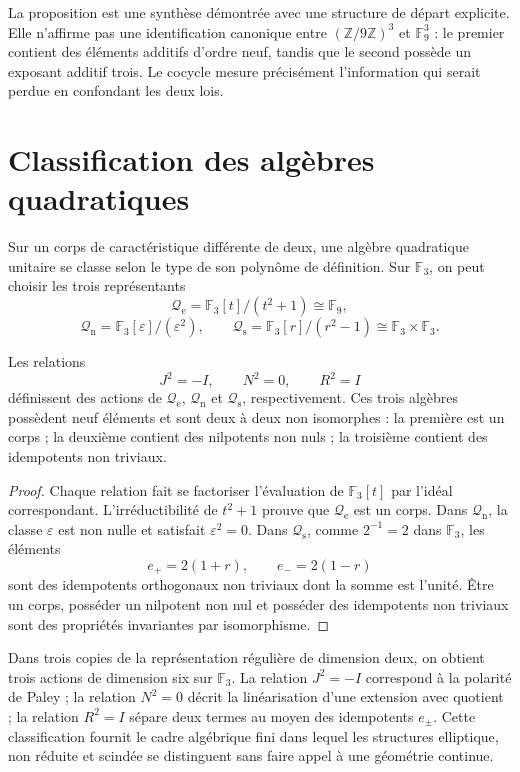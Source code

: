 La proposition est une synthèse démontrée avec une structure de départ
explicite. Elle n'affirme pas une identification canonique entre
\((\mathbb Z/9\mathbb Z)^3\) et \(\mathbb F_9^3\) : le premier contient des
éléments additifs d'ordre neuf, tandis que le second possède un exposant
additif trois. Le cocycle mesure précisément l'information qui serait perdue en
confondant les deux lois.

\section{Classification des algèbres quadratiques}

Sur un corps de caractéristique différente de deux, une algèbre quadratique
unitaire se classe selon le type de son polynôme de définition. Sur
\(\mathbb F_3\), on peut choisir les trois représentants
\[
 \mathcal Q_{\mathrm e}
 =\mathbb F_3[t]/(t^2+1)\cong\mathbb F_9,
\]
\[
 \mathcal Q_{\mathrm n}
 =\mathbb F_3[\varepsilon]/(\varepsilon^2),
 \qquad
 \mathcal Q_{\mathrm s}
 =\mathbb F_3[r]/(r^2-1)
 \cong\mathbb F_3\times\mathbb F_3.
\]

\begin{theorem}
\label{thm:clasificacion-cuadratica-nonadica}
Les relations
\[
 J^2=-I,\qquad N^2=0,\qquad R^2=I
\]
définissent des actions de
\(\mathcal Q_{\mathrm e}\), \(\mathcal Q_{\mathrm n}\) et
\(\mathcal Q_{\mathrm s}\), respectivement. Ces trois algèbres possèdent
neuf éléments et sont deux à deux non isomorphes : la première est un corps ; la
deuxième contient des nilpotents non nuls ; la troisième contient des idempotents non
triviaux.
\end{theorem}

\begin{proof}
Chaque relation fait se factoriser l'évaluation de
\(\mathbb F_3[t]\) par l'idéal correspondant. L'irréductibilité de
\(t^2+1\) prouve que \(\mathcal Q_{\mathrm e}\) est un corps. Dans
\(\mathcal Q_{\mathrm n}\), la classe \(\varepsilon\) est non nulle et satisfait
\(\varepsilon^2=0\). Dans \(\mathcal Q_{\mathrm s}\), comme \(2^{-1}=2\) dans
\(\mathbb F_3\), les éléments
\[
 e_+=2(1+r),\qquad e_-=2(1-r)
\]
sont des idempotents orthogonaux non triviaux dont la somme est l'unité. Être un corps,
posséder un nilpotent non nul et posséder des idempotents non triviaux sont des
propriétés invariantes par isomorphisme.
\end{proof}

Dans trois copies de la représentation régulière de dimension deux, on obtient
trois actions de dimension six sur \(\mathbb F_3\). La relation
\(J^2=-I\) correspond à la polarité de Paley ; la relation \(N^2=0\)
décrit la linéarisation d'une extension avec quotient ; la relation
\(R^2=I\) sépare deux termes au moyen des idempotents \(e_\pm\). Cette
classification fournit le cadre algébrique fini dans lequel les
structures elliptique, non réduite et scindée se distinguent sans faire appel à une
géométrie continue.

